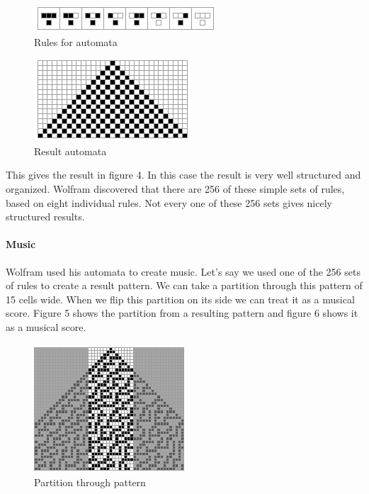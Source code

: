 \documentclass[12pt]{article}
\begin{document}
\begin{figure}[h]
\centering
\includegraphics[]{img/wolframRules}
\caption{Rules for automata}
\end{figure}

\begin{figure}[h]
\centering
\includegraphics[]{img/wolframResult-15}
\caption{Result automata}
\end{figure}

This gives the result in figure 4. In this case the result is very well structured and organized. Wolfram discovered that there are 256 of these simple sets of rules, based on eight individual rules. Not every one of these 256 sets gives nicely structured results.

\paragraph{Music}

Wolfram used his automata to create music. Let's say we used one of the 256 sets of rules to create a result pattern. We can take a partition through this pattern of 15 cells wide. When we flip this partition on its side we can treat it as a musical score.
Figure 5 shows the partition from a resulting pattern and figure 6 shows it as a musical score.
\newline

 \begin{figure}[h]
\centering
\includegraphics[]{img/wolframMusic1}
\caption{Partition through pattern}
\end{figure}
\end{document}
